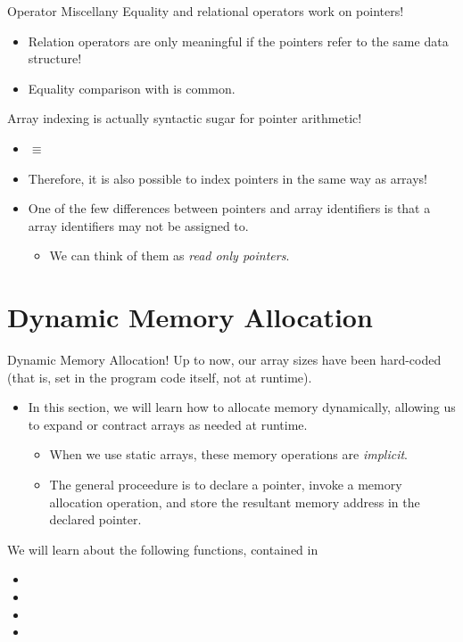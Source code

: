 \documentclass[11pt]{beamer}
\let\OldTexttt\texttt
\renewcommand{\texttt}[1]{\OldTexttt{\color{teal}{#1}}}
\begin{document}
\begin{frame}{Operator Miscellany}
Equality and relational operators work on pointers! 
\begin{itemize}
\item Relation operators are only meaningful if the pointers refer to the same data structure! 
\item Equality comparison with \texttt{NULL} is common.
\end{itemize}
Array indexing is actually syntactic sugar for pointer arithmetic! 
\begin{itemize}
\item \texttt{foo[3]} $\equiv$ \texttt{*(foo + 3)}
\item Therefore, it is also possible to index pointers in the same way as arrays! 
\item One of the few differences between pointers and array identifiers is that a array identifiers may not be assigned to.  
\begin{itemize}
\item We can think of them as \emph{read only pointers}.
\end{itemize}
\end{itemize}
\end{frame}

\section[malloc]{Dynamic Memory Allocation}
\begin{frame}{Dynamic Memory Allocation!}
Up to now, our array sizes have been hard-coded (that is, set in the program code itself, not at runtime).
\begin{itemize}
\item In this section, we will learn how to allocate memory dynamically, allowing us to expand or contract arrays as needed at runtime. 
\begin{itemize}
\item When we use static arrays, these memory operations are \emph{implicit}.
\item The general proceedure is to declare a pointer, invoke a memory allocation operation, and store the resultant memory address in the declared pointer.
\end{itemize}
\end{itemize}
We will learn about the following functions, contained in \texttt{stdlib.h}
\vspace{-1em}
\begin{itemize}
\item \texttt{malloc()}
\item \texttt{free()}
\item \texttt{calloc()}
\item \texttt{realloc()}
\end{itemize}

\end{frame}
\end{document}
